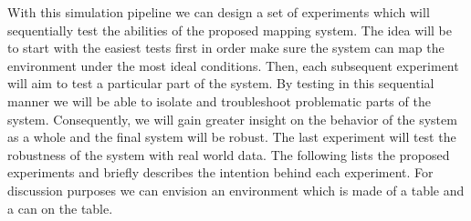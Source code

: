 \documentclass[12pt]{article}
\begin{document}
With this simulation pipeline we can design a set of experiments which will
sequentially test the abilities of the proposed mapping system. The idea
will be to start with the easiest tests first in order make sure the system
can map the environment under the most ideal conditions. Then, each
subsequent experiment will aim to test a particular part of the system. By
testing in this sequential manner we will be able to isolate and
troubleshoot problematic parts of the system. Consequently, we will gain
greater insight on the behavior of the system as a whole and the final
system will be robust. The last experiment will test the robustness of the
system with real world data. The following lists the proposed experiments
and briefly describes the intention behind each experiment. For discussion
purposes we can envision an environment which is made of a table and a can
on the table. 
\end{document}
